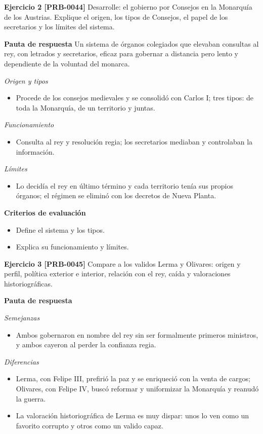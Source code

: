 \documentclass{book}
\begin{document}
\noindent\textbf{Ejercicio 2 [PRB-0044]}
Desarrolle: el gobierno por Consejos en la Monarquía de los Austrias. Explique el origen, los tipos de Consejos, el papel de los secretarios y los límites del sistema.


\noindent\textbf{Pauta de respuesta}
Un sistema de órganos colegiados que elevaban consultas al rey, con letrados y secretarios, eficaz para gobernar a distancia pero lento y dependiente de la voluntad del monarca.


\noindent\textit{Origen y tipos}
\begin{itemize}
\item Procede de los consejos medievales y se consolidó con Carlos I; tres tipos: de toda la Monarquía, de un territorio y juntas.
\end{itemize}

\noindent\textit{Funcionamiento}
\begin{itemize}
\item Consulta al rey y resolución regia; los secretarios mediaban y controlaban la información.
\end{itemize}

\noindent\textit{Límites}
\begin{itemize}
\item Lo decidía el rey en último término y cada territorio tenía sus propios órganos; el régimen se eliminó con los decretos de Nueva Planta.
\end{itemize}

\noindent\textbf{Criterios de evaluación}
\begin{itemize}
\item Define el sistema y los tipos.
\item Explica su funcionamiento y límites.
\end{itemize}

\noindent\textbf{Ejercicio 3 [PRB-0045]}
Compare a los validos Lerma y Olivares: origen y perfil, política exterior e interior, relación con el rey, caída y valoraciones historiográficas.


\noindent\textbf{Pauta de respuesta}

\noindent\textit{Semejanzas}
\begin{itemize}
\item Ambos gobernaron en nombre del rey sin ser formalmente primeros ministros, y ambos cayeron al perder la confianza regia.
\end{itemize}

\noindent\textit{Diferencias}
\begin{itemize}
\item Lerma, con Felipe III, prefirió la paz y se enriqueció con la venta de cargos; Olivares, con Felipe IV, buscó reformar y uniformizar la Monarquía y reanudó la guerra.
\item La valoración historiográfica de Lerma es muy dispar: unos lo ven como un favorito corrupto y otros como un valido capaz.
\end{itemize}
\end{document}
